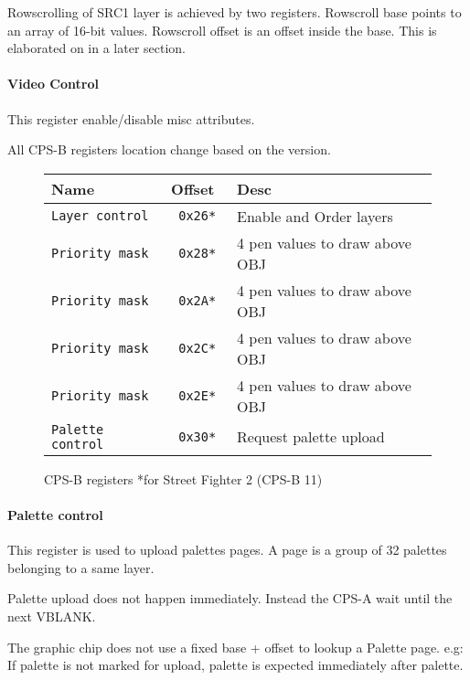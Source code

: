 Rowscrolling of SRC1 layer is achieved by two registers. Rowscroll base points to an array of 16-bit values. Rowscroll offset is an offset inside the base. This is elaborated on in a later section.


\paragraph{Video Control} This register enable/disable misc attributes.

 


\pagebreak

All CPS-B registers location change based on the version.

 \begin{figure}[H]
\begin{tabularx}{\textwidth}{llX}
  \toprule    
  \textbf{Name } & \textbf{ Offset }  & \textbf{Desc }\\  
  \toprule   
  \texttt{Layer control} & \texttt{ 0x26* } & Enable and Order layers\\      
\texttt{Priority mask} & \texttt{ 0x28* } &  4 pen values to draw above OBJ   \\  
\texttt{Priority mask} & \texttt{ 0x2A* } &  4 pen values to draw above OBJ   \\  
\texttt{Priority mask} & \texttt{ 0x2C* } &  4 pen values to draw above OBJ   \\  
\texttt{Priority mask} & \texttt{ 0x2E* } &  4 pen values to draw above OBJ  \\  
\texttt{Palette control} & \texttt{ 0x30* } &  Request palette upload\\ 
  \toprule   
\end{tabularx}
\caption*{CPS-B registers *for Street Fighter 2	(CPS-B 11)}
\end{figure}

\paragraph{Palette control}This register is used to upload palettes pages. A page is a group of 32 palettes belonging to a same layer.

 

Palette upload does not happen immediately. Instead the CPS-A wait until the next VBLANK.

The graphic chip does not use a fixed base + offset to lookup a Palette page. e.g: If  palette is not marked for upload,  palette is expected immediately after  palette.



